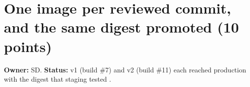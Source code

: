 \begin{longlisting}
\inputminted[fontsize=\scriptsize]{docker}{config/twintrack/pricing-service/Dockerfile}
\caption{\texttt{pricing-service/Dockerfile} on \texttt{main}: base image by digest, hashed install, pinned \texttt{zlib1g}, non-root user.}
\label{Listing:EDeliveryDockerfile}
\end{longlisting}

\begin{longlisting}
\inputminted[fontsize=\scriptsize]{text}{evidence/170-server-baseline-before-delivery-sd-2026-11-12.txt}
\caption{Read-only server baseline before any delivery work, November 12, 2026, 7:56~PM (real output).}
\label{Listing:E170}
\end{longlisting}

\begin{longlisting}
\inputminted[fontsize=\scriptsize]{text}{evidence/171-v1-unit-tests-pass-controlled-failure-restore-sd-2026-11-12.txt}
\caption{v1 tests: pass, a controlled failure, and the restore, November 12, 2026 (real output).}
\label{Listing:E171}
\end{longlisting}

\begin{longlisting}
\inputminted[fontsize=\scriptsize]{text}{evidence/172-locked-dependencies-base-image-digest-pip-audit-sd-2026-11-12.txt}
\caption{The lock with hashes, the base-image digests and pip-audit, November 12, 2026 (real output).}
\label{Listing:E172}
\end{longlisting}

\begin{longlisting}
\inputminted[fontsize=\scriptsize]{text}{evidence/173-v1-image-local-build-hardened-run-endpoint-checks-sd-2026-11-12.txt}
\caption{A local, unpublished v1 build run with the production restrictions; endpoint checks, November 12, 2026 (real output).}
\label{Listing:E173}
\end{longlisting}

\section{One image per reviewed commit, and the same digest promoted (10 points)}\label{Section:deliveryImage}
\textbf{Owner:} SD. \textbf{Status:} v1 (build \#7) and v2 (build \#11) each reached production with the digest that staging tested \StatusPass.

